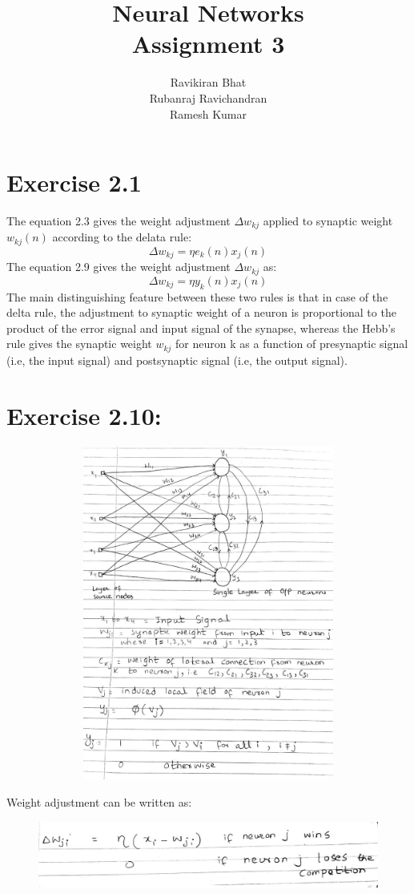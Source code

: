 \documentclass[12pt]{article}
\title{\Huge Neural Networks \\
[6mm]
Assignment 3\\}
\author{Ravikiran Bhat\\
Rubanraj Ravichandran\\
Ramesh Kumar}
\begin{document}
\maketitle
\newpage
\section{Exercise 2.1}
The equation 2.3 gives the weight adjustment $\Delta w_{kj}$ applied to synaptic weight $w_{kj}(n)$ according to the delata rule: \\
$$\Delta w_{kj} = \eta e_{k}(n) x_{j}(n)$$  
The equation 2.9 gives the weight adjustment $\Delta w_{kj}$ as: $$\Delta w_{kj} = \eta y_{k}(n) x_{j}(n)$$  
The main distinguishing feature between these two rules is that in case of the delta rule, the adjustment to synaptic weight of a neuron is proportional to the product of the error signal and input signal of the synapse, whereas the Hebb's rule gives the synaptic weight $w_{kj}$ for neuron k as a function of presynaptic signal (i.e, the input signal) and postsynaptic signal (i.e, the output signal).
\newpage   
\section{Exercise 2.10:}
\begin{figure}[h]
	\begin{center}
		\includegraphics[width = 15cm, height = 11cm]{2_10.jpg}
	\end{center}
\end{figure}
Weight adjustment can be written as:
\begin{figure}[h]

			\includegraphics[scale = 0.30]{2_10a.jpg}

\end{figure}
\end{document}
